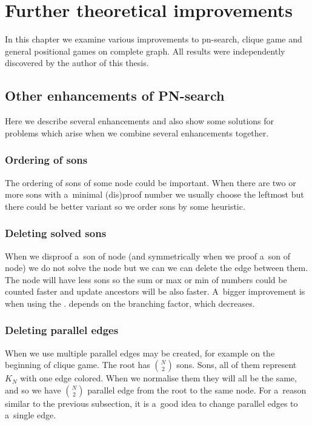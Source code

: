 \chapter{Further theoretical improvements}

In this chapter we examine various improvements to pn-search, clique
game and general positional games on complete graph. All results
were independently discovered by the author of this thesis.

\section{Other enhancements of PN-search} 
Here we describe several enhancements
and also show some solutions for problems which arise when we combine several
 enhancements together. 

\subsection{Ordering of sons} \label{ord}

The ordering of sons of some node could be important. When there are two or more
sons with a~minimal (dis)proof number we usually choose the leftmost but there could
be better variant so we order sons by some heuristic.

\subsection{Deleting solved sons}

When we disproof a~son of  node (and symmetrically when we proof a~son
of  node) we do not solve the node but we can we can delete the edge
between them. The node will have less sons so the sum or max or min of numbers
could be counted faster and update ancestors will be also faster. A~bigger
improvement is when using the .  depends on
the branching factor, which decreases.

\subsection{Deleting parallel edges } \label{multi-edges} 

When we use  multiple parallel edges may be
created, for example on the beginning of clique game. The root has $N \choose
2$ sons. Sons, all of them represent $K_N$ with one edge colored. When we
normalise them they will all be the same, and so we have $N \choose 2$ parallel
edge from the root to the same node. For a~reason similar to the previous
subsection, it is a~good idea to change parallel edges to a~single edge.

